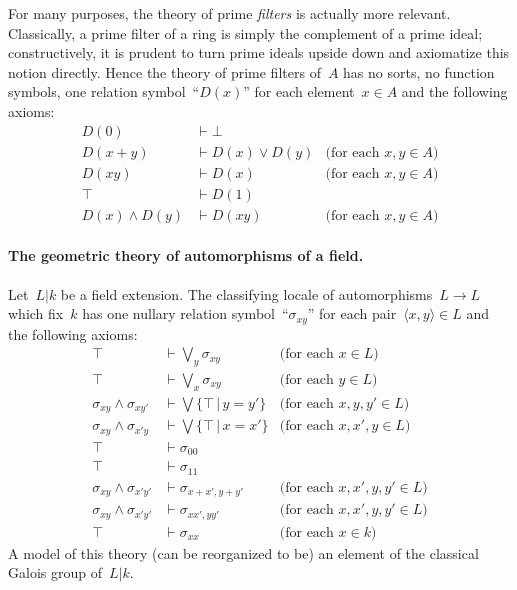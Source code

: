 \documentclass{ws-rv9x6}
\renewcommand{\_}{\mathpunct{.}}
\newcommand{\?}{\,{:}\,}
\begin{document}
For many purposes, the theory of prime \emph{filters} is actually more
relevant. Classically, a prime filter of a ring is simply the complement of a
prime ideal; constructively, it is prudent to turn prime ideals upside down and axiomatize this notion directly.
Hence the theory of prime filters of~$A$ has no sorts, no function symbols, one
relation symbol~``$D(x)$'' for each element~$x \in A$ and the following
axioms:
\begin{align*}
  D(0) &\vdash \bot \\
  D(x+y) &\vdash D(x) \vee D(y) & \text{(for each~$x,y \in A$)} \\
  D(xy) &\vdash D(x) & \text{(for each~$x,y \in A$)} \\
  \top &\vdash D(1) \\
  D(x) \wedge D(y) &\vdash D(xy) & \text{(for each~$x,y \in A$)}
\end{align*}

\paragraph{The geometric theory of automorphisms of a field.}\label{par:theory-automorphisms}
Let~$L|k$ be a field
extension. The classifying locale of automorphisms~$L \to L$ which fix~$k$ has
one nullary relation symbol~``$\sigma_{xy}$'' for each pair~$\langle x,y
\rangle \in L$ and the following axioms:
\begin{align*}
  \top &\vdash \bigvee_y \sigma_{xy} & \text{(for each~$x \in L$)} \\
  \top &\vdash \bigvee_x \sigma_{xy} & \text{(for each~$y \in L$)} \\
  \sigma_{xy} \wedge \sigma_{xy'} &\vdash \bigvee\{ \top \,|\, y = y' \} & \text{(for each~$x,y,y' \in L$)} \\
  \sigma_{xy} \wedge \sigma_{x'y} &\vdash \bigvee\{ \top \,|\, x = x' \} & \text{(for each~$x,x',y \in L$)} \\
  \top &\vdash \sigma_{00} \\
  \top &\vdash \sigma_{11} \\
  \sigma_{xy} \wedge \sigma_{x'y'} &\vdash \sigma_{x+x',y+y'} & \text{(for each~$x,x',y,y' \in L$)} \\
  \sigma_{xy} \wedge \sigma_{x'y'} &\vdash \sigma_{xx',yy'} & \text{(for each~$x,x',y,y' \in L$)} \\
  \top &\vdash \sigma_{xx} & \text{(for each~$x \in k$)}
\end{align*}
A model of this theory (can be reorganized to be) an element of the classical
Galois group of~$L|k$.
\end{document}

